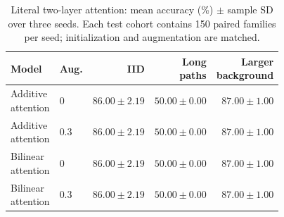 \begin{table}[tbp]
\centering
\caption{Literal two-layer attention: mean accuracy (\%) $\pm$ sample SD over three seeds. Each test cohort contains 150 paired families per seed; initialization and augmentation are matched.}
\label{tab:literal_bilinear}
\evidencetable
\begin{tabular}{llrrr}
\toprule
Model & Aug. & IID & \makecell{Long\\paths} & \makecell{Larger\\background} \\
\midrule
\makecell[l]{Additive\\attention} & 0 & $86.00 \pm 2.19$ & $50.00 \pm 0.00$ & $87.00 \pm 1.00$ \\
\makecell[l]{Additive\\attention} & 0.3 & $86.00 \pm 2.19$ & $50.00 \pm 0.00$ & $87.00 \pm 1.00$ \\
\makecell[l]{Bilinear\\attention} & 0 & $86.00 \pm 2.19$ & $50.00 \pm 0.00$ & $87.00 \pm 1.00$ \\
\makecell[l]{Bilinear\\attention} & 0.3 & $86.00 \pm 2.19$ & $50.00 \pm 0.00$ & $87.00 \pm 1.00$ \\
\bottomrule
\end{tabular}
\end{table}
